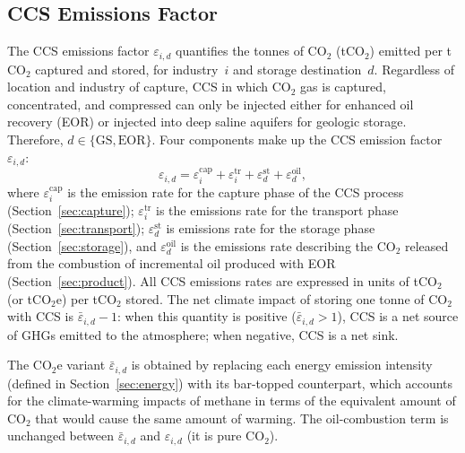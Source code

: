 \documentclass[11pt]{article}
\newcommand{\cotwo}{\ensuremath{\mathrm{CO_2}}}
\newcommand{\cotwoe}{\ensuremath{\mathrm{CO_{2}e}}}
\begin{document}
\subsection{CCS Emissions Factor}
\label{sec:lifecycle}

The CCS  emissions factor $\varepsilon_{i,d}$ quantifies the tonnes of \cotwo{} (t\cotwo{}) emitted per t\cotwo{} captured and stored, for industry~$i$ and storage destination~$d$. Regardless of location and industry of capture, CCS in which \cotwo{} gas is captured, concentrated, and compressed can only be injected either for enhanced oil recovery (EOR) or injected into deep saline aquifers for geologic storage. Therefore, $d \in \{\text{GS}, \text{EOR}\}$. Four components make up the CCS emission factor $\varepsilon_{i,d}$:
%
\begin{equation}
  \varepsilon_{i,d} = \varepsilon_i^{\text{cap}}
    + \varepsilon_i^{\text{tr}}
    + \varepsilon_d^{\text{st}}
    + \varepsilon_d^{\text{oil}},
  \label{eq:ccs_total}
\end{equation}
%
where $\varepsilon_i^{\text{cap}}$ is the emission rate for the capture phase of the CCS process (Section~\ref{sec:capture}); $\varepsilon_i^{\text{tr}}$ is the emissions rate for the transport phase (Section~\ref{sec:transport}); $\varepsilon_d^{\text{st}}$ is emissions rate for the storage phase (Section~\ref{sec:storage}), and $\varepsilon_d^{\text{oil}}$ is the emissions rate describing the \cotwo{} released from the combustion of incremental oil produced with EOR (Section~\ref{sec:product}). All CCS emissions rates are expressed in units of t\cotwo{} (or t\cotwoe{}) per t\cotwo{} stored.
The net climate impact of storing one tonne of \cotwo{} with CCS is $\bar\varepsilon_{i,d} - 1$: when this quantity is positive ($\bar\varepsilon_{i,d} > 1$), CCS is a net source of GHGs emitted to the atmosphere; when negative, CCS is a net sink.

The \cotwoe{} variant $\bar{\varepsilon}_{i,d}$ is obtained by replacing each energy emission intensity (defined in Section~\ref{sec:energy}) with its bar-topped counterpart, which accounts for the climate-warming impacts of methane in terms of the equivalent amount of \cotwo{} that would cause the same amount of warming. The oil-combustion term is unchanged between $\bar{\varepsilon}_{i,d}$ and $\varepsilon_{i,d}$ (it is pure \cotwo{}).
\end{document}
